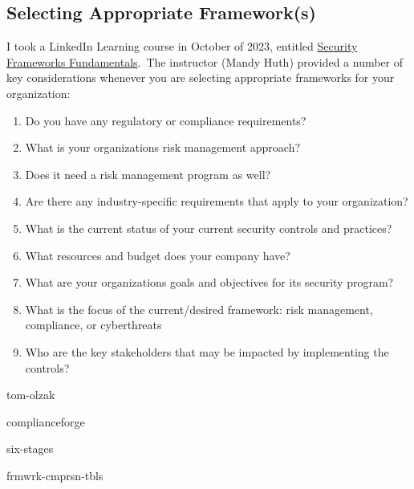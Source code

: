 \documentclass[12pt]{article}
\begin{document}
                                                                  
                \subsection{Selecting Appropriate Framework(s)}
                                  
                                  I took a LinkedIn Learning course in October of 2023, entitled \href{https://www.linkedin.com/learning/security-frameworks-fundamentals?u=70639972}{Security Frameworks Fundamentals}.\ The instructor (Mandy Huth) provided a number of key considerations whenever you are selecting appropriate frameworks for your organization:
\vspace{10pt}

\begin{enumerate}
\item Do you have any regulatory or compliance requirements?
\item What is your organizations risk management approach?
\item Does it need a risk management program as well?
\item Are there any industry-specific requirements that apply to your organization?
\item What is the current status of your current security controls and practices?
\item What resources and budget does your company have?
\item What are your organizations goals and objectives for its security program?
\item What is the focus of the current/desired framework: risk management, compliance, or cyberthreats
\item Who are the key stakeholders that may be impacted by implementing the controls?
\end{enumerate}
\vspace{10pt}

                                        {tom-olzak}
                                        
                                        {complianceforge}
                                        
                                        {six-stages}
                                        
                                        {frmwrk-cmprsn-tbls}
\end{document}
